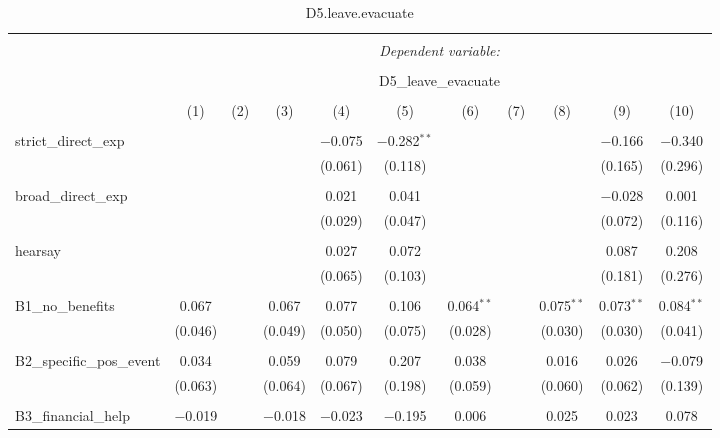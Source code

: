 
\begin{table}[H] \centering 
  \caption{D5.leave.evacuate} 
  \label{} 
\tiny 
\begin{tabular}{@{\extracolsep{4pt}}lcccccccccc} 
\\[-1.8ex]\hline 
\hline \\[-1.8ex] 
 & \multicolumn{10}{c}{\textit{Dependent variable:}} \\ 
\cline{2-11} 
\\[-1.8ex] & \multicolumn{10}{c}{D5\_leave\_evacuate} \\ 
\\[-1.8ex] & (1) & (2) & (3) & (4) & (5) & (6) & (7) & (8) & (9) & (10)\\ 
\hline \\[-1.8ex] 
 strict\_direct\_exp &  &  &  & $-$0.075 & $-$0.282$^{**}$ &  &  &  & $-$0.166 & $-$0.340 \\ 
  &  &  &  & (0.061) & (0.118) &  &  &  & (0.165) & (0.296) \\ 
  & & & & & & & & & & \\ 
 broad\_direct\_exp &  &  &  & 0.021 & 0.041 &  &  &  & $-$0.028 & 0.001 \\ 
  &  &  &  & (0.029) & (0.047) &  &  &  & (0.072) & (0.116) \\ 
  & & & & & & & & & & \\ 
 hearsay &  &  &  & 0.027 & 0.072 &  &  &  & 0.087 & 0.208 \\ 
  &  &  &  & (0.065) & (0.103) &  &  &  & (0.181) & (0.276) \\ 
  & & & & & & & & & & \\ 
 B1\_no\_benefits & 0.067 &  & 0.067 & 0.077 & 0.106 & 0.064$^{**}$ &  & 0.075$^{**}$ & 0.073$^{**}$ & 0.084$^{**}$ \\ 
  & (0.046) &  & (0.049) & (0.050) & (0.075) & (0.028) &  & (0.030) & (0.030) & (0.041) \\ 
  & & & & & & & & & & \\ 
 B2\_specific\_pos\_event & 0.034 &  & 0.059 & 0.079 & 0.207 & 0.038 &  & 0.016 & 0.026 & $-$0.079 \\ 
  & (0.063) &  & (0.064) & (0.067) & (0.198) & (0.059) &  & (0.060) & (0.062) & (0.139) \\ 
  & & & & & & & & & & \\ 
 B3\_financial\_help & $-$0.019 &  & $-$0.018 & $-$0.023 & $-$0.195 & 0.006 &  & 0.025 & 0.023 & 0.078 \\ 

\end{tabular}
\end{table}
